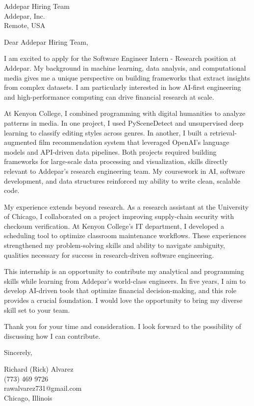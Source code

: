 \documentclass[a4paper,10pt]{letter}
\begin{document}
\begin{letter}{Addepar Hiring Team \\
Addepar, Inc. \\
Remote, USA}

\opening{Dear Addepar Hiring Team,}

I am excited to apply for the Software Engineer Intern - Research position at Addepar. My background in machine learning, data analysis, and computational media gives me a unique perspective on building frameworks that extract insights from complex datasets. I am particularly interested in how AI-first engineering and high-performance computing can drive financial research at scale.

At Kenyon College, I combined programming with digital humanities to analyze patterns in media. In one project, I used PySceneDetect and unsupervised deep learning to classify editing styles across genres. In another, I built a retrieval-augmented film recommendation system that leveraged OpenAI’s language models and API-driven data pipelines. Both projects required building frameworks for large-scale data processing and visualization, skills directly relevant to Addepar’s research engineering team. My coursework in AI, software development, and data structures reinforced my ability to write clean, scalable code.

My experience extends beyond research. As a research assistant at the University of Chicago, I collaborated on a project improving supply-chain security with checksum verification. At Kenyon College’s IT department, I developed a scheduling tool to optimize classroom maintenance workflows. These experiences strengthened my problem-solving skills and ability to navigate ambiguity, qualities necessary for success in research-driven software engineering.

This internship is an opportunity to contribute my analytical and programming skills while learning from Addepar’s world-class engineers. In five years, I aim to develop AI-driven tools that optimize financial decision-making, and this role provides a crucial foundation. I would love the opportunity to bring my diverse skill set to your team.

Thank you for your time and consideration. I look forward to the possibility of discussing how I can contribute. 

\closing{Sincerely,}

Richard (Rick) Alvarez \\
(773) 469 9726 \\
rawalvarez731@gmail.com \\
Chicago, Illinois

\end{letter}
\end{document}
